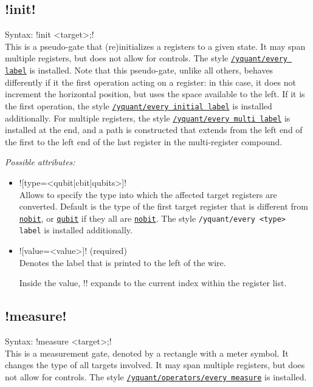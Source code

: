 \documentclass{scrartcl}
\def\gate#1{\hyperref[gate:#1]{\texttt{#1}}}
\def\style#1{\hyperref[style:#1]{\texttt{#1}}}
\begin{document}
      \subsection{\texorpdfstring{\yquant!init!}{init}}\label{gate:init}
         Syntax: \yquant!init <target>;! \\
         This is a pseudo\hyp gate that (re)initializes a registers to a given state.
         It may span multiple registers, but does not allow for controls.
         The style \style{/yquant/every label} is installed.
         Note that this pseudo\hyp gate, unlike all others, behaves differently if it the first operation acting on a register: in this case, it does not increment the horizontal position, but uses the space available to the left.
         If it is the first operation, the style \style{/yquant/every initial label} is installed additionally.
         For multiple registers, the style \style{/yquant/every multi label} is installed at the end, and a path is constructed that extends from the left end of the first to the left end of the last register in the multi\hyp register compound.
         
         \emph{Possible attributes:}
         \begin{itemize}
            \item \yquant![type=<qubit|cbit|qubits>]! \\
               Allows to specify the type into which the affected target registers are converted.
               Default is the type of the first target register that is different from \gate{nobit}, or \gate{qubit} if they all are \gate{nobit}.
               The style \texttt{/yquant/every <type> label} is installed additionally.
            \item \yquant![value=<value>]! (required) \\
               Denotes the label that is printed to the left of the wire.
               
               Inside the value, \tex!\idx! expands to the current index within the register list.
         \end{itemize}
      
      \clearpage
      \subsection{\texorpdfstring{\yquant!measure!}{measure}}\label{gate:measure}
         Syntax: \yquant!measure <target>;! \\
         This is a measurement gate, denoted by a rectangle with a meter symbol.
         It changes the type of all targets involved.
         It may span multiple registers, but does not allow for controls.
         The style \style{/yquant/operators/every measure} is installed.
         
\end{document}
